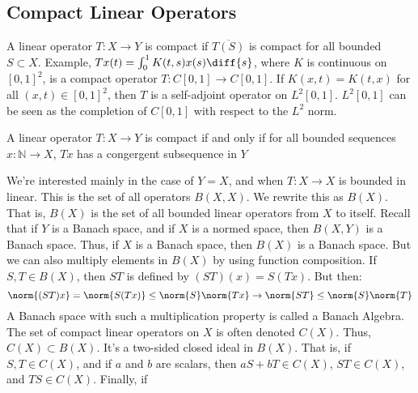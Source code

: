         \subsection{Compact Linear Operators}
            A linear operator $T:X\rightarrow{Y}$
            is compact if $\overline{T(S)}$ is compact
            for all bounded $S\subset{X}$. Example,
            $Tx(t)=\int_{0}^{1}K(t,s)x(s)\diff{s}$,
            where $K$ is continuous on
            $[0,1]^{2}$, is a compact operator
            $T:C[0,1]\rightarrow{C[0,1]}$. If
            $K(x,t)=K(t,x)$ for all
            $(x,t)\in[0,1]^{2}$, then
            $T$ is a self-adjoint operator on
            $L^{2}[0,1]$. $L^{2}[0,1]$ can be seen
            as the completion of $C[0,1]$ with respect
            to the $L^{2}$ norm.
            \begin{theorem}
                A linear operator
                $T:X\rightarrow{Y}$ is compact if and only
                if for all bounded sequences
                $x:\mathbb{N}\rightarrow{X}$,
                $Tx$ has a congergent subsequence in $Y$
            \end{theorem}
            We're interested mainly in the case of $Y=X$,
            and when $T:X\rightarrow{X}$ is bounded in
            linear. This is the set of all operators
            $B(X,X)$. We rewrite this as $B(X)$. That is,
            $B(X)$ is the set of all bounded linear operators
            from $X$ to itself. Recall that if
            $Y$ is a Banach space, and if $X$ is a normed
            space, then $B(X,Y)$ is a Banach space. Thus,
            if $X$ is a Banach space, then $B(X)$ is a
            Banach space. But we can also multiply elements
            in $B(X)$ by using function composition.
            If $S,T\in{B(X)}$, then $ST$ is defined by
            $(ST)(x)=S(Tx)$. But then:
            \begin{equation*}
                \norm{(ST)x}=\norm{S(Tx)}
                \leq\norm{S}\norm{Tx}
                \rightarrow
                \norm{ST}\leq\norm{S}\norm{T}
            \end{equation*}
            A Banach space with such a multiplication
            property is called a Banach Algebra. The set of
            compact linear operators on $X$ is often denoted
            $C(X)$. Thus, $C(X)\subset{B(X)}$. It's
            a two-sided closed ideal in $B(X)$. That is,
            if $S,T\in{C(X)}$, and if $a$ and $b$ are scalars,
            then $aS+bT\in{C(X)}$, $ST\in{C(X)}$,
            and $TS\in{C(X)}$. Finally, if
